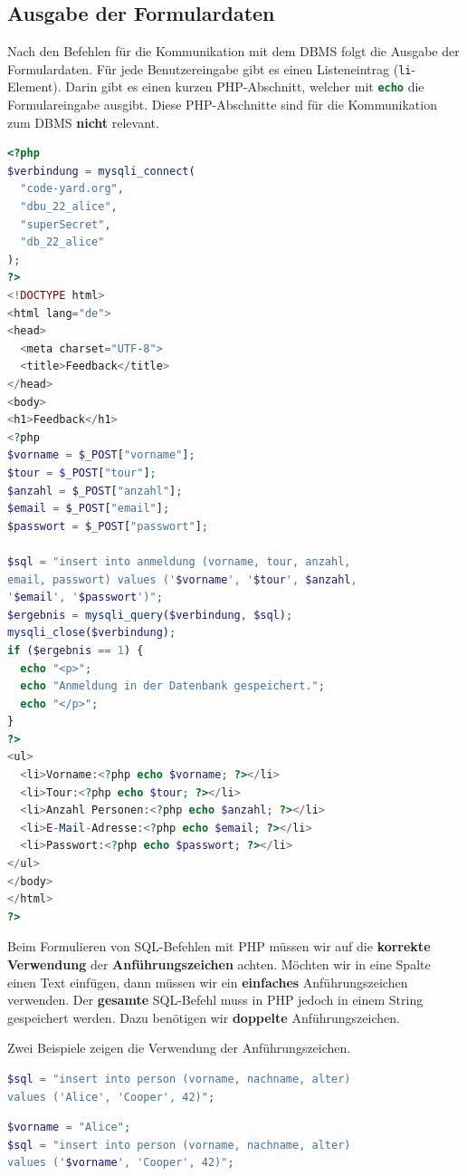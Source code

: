 \subsection{Ausgabe der Formulardaten}

Nach den Befehlen für die Kommunikation mit dem \ac{DBMS} folgt die Ausgabe der Formulardaten. Für jede Benutzereingabe gibt es einen Listeneintrag (\lstinline[language=HTML]{li}-Element). Darin gibt es einen kurzen \ac{PHP}-Abschnitt, welcher mit \lstinline[language=PHP]{echo} die Formulareingabe ausgibt. Diese \ac{PHP}-Abschnitte sind für die Kommunikation zum \ac{DBMS} \textbf{nicht} relevant.

\begin{lstlisting}[language=PHP, alsolanguage=HTML, upquote=true, caption={Anmeldedaten werden in der Tabelle \texttt{anmeldung} gespeichert.}, label={lst-php-insert-into}]
<?php
$verbindung = mysqli_connect(
  "code-yard.org",
  "dbu_22_alice",
  "superSecret",
  "db_22_alice"
);
?>
<!DOCTYPE html>
<html lang="de">
<head>
  <meta charset="UTF-8">
  <title>Feedback</title>
</head>
<body>
<h1>Feedback</h1>
<?php
$vorname = $_POST["vorname"];
$tour = $_POST["tour"];
$anzahl = $_POST["anzahl"];
$email = $_POST["email"];
$passwort = $_POST["passwort"];

$sql = "insert into anmeldung (vorname, tour, anzahl, 
email, passwort) values ('$vorname', '$tour', $anzahl, 
'$email', '$passwort')";
$ergebnis = mysqli_query($verbindung, $sql);
mysqli_close($verbindung);
if ($ergebnis == 1) {
  echo "<p>";
  echo "Anmeldung in der Datenbank gespeichert.";
  echo "</p>";
}
?>
<ul>
  <li>Vorname:<?php echo $vorname; ?></li>
  <li>Tour:<?php echo $tour; ?></li>
  <li>Anzahl Personen:<?php echo $anzahl; ?></li>
  <li>E-Mail-Adresse:<?php echo $email; ?></li>
  <li>Passwort:<?php echo $passwort; ?></li>
</ul>
</body>
</html>
?>
\end{lstlisting}

\begin{important}
Beim Formulieren von \ac{SQL}-Befehlen mit \ac{PHP} müssen wir auf die \textbf{korrekte Verwendung} der \textbf{Anführungszeichen} achten. Möchten wir in eine Spalte einen Text einfügen, dann müssen wir ein \textbf{einfaches} Anführungszeichen verwenden. Der \textbf{gesamte} \ac{SQL}-Befehl muss in \ac{PHP} jedoch in einem String gespeichert werden. Dazu benötigen wir \textbf{doppelte} Anführungszeichen.
\end{important}

\begin{example}
Zwei Beispiele zeigen die Verwendung der Anführungszeichen.

\begin{lstlisting}[language=PHP, upquote=true]
$sql = "insert into person (vorname, nachname, alter) 
values ('Alice', 'Cooper', 42)";
\end{lstlisting}

\begin{lstlisting}[language=PHP, upquote=true]
$vorname = "Alice";
$sql = "insert into person (vorname, nachname, alter) 
values ('$vorname', 'Cooper', 42)";
\end{lstlisting}

\end{example}

